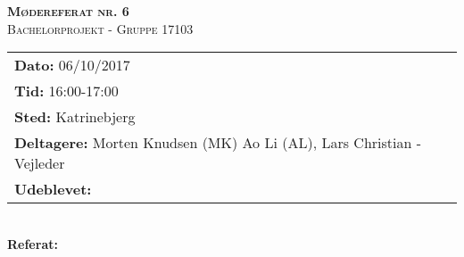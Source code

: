 
\newcommand{\HRule}{\rule{\linewidth}{0.1mm}}


	\begin{center}
		{\huge \bfseries \textsc{Mødereferat nr. 6}}\\
		\textsc{\large Bachelorprojekt - Gruppe 17103}\\[0.3cm]
	\end{center}
	\begin{tabular}{ll}
	\large \textbf{Dato:} 06/10/2017  	\\ %
	\large \textbf{Tid:}  16:00-17:00 	\\ %
	\large \textbf{Sted:} Katrinebjerg		\\ %
	\large \textbf{Deltagere:} Morten Knudsen (MK) Ao Li (AL), Lars Christian - Vejleder \\
	\large \textbf{Udeblevet:} 
	\end{tabular}\\
	\phantom{\,}\hspace{0.1em} \large \textbf{Referat:}
